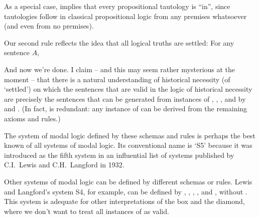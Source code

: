 As a special case,  implies that every propositional tautology is
``in'', since tautologies follow in classical propositional logic from any
premises whatsoever (and even from no premises).

Our second rule reflects the idea that all logical truths are settled: For any
sentence $A$,
%
\begin{principles}
\end{principles}


And now we're done. I claim -- and this may seem rather mysterious at the moment
-- that there is a natural understanding of historical necessity (of `settled')
on which the sentences that are valid in the logic of historical necessity are
precisely the sentences that can be generated from instances of , ,
,  and  by  and . (In fact,  is
redundant: any instance of  can be derived from the remaining axioms and
rules.)

The system of modal logic defined by these schemas and  rules is perhaps the
best known of all systems of modal logic. Its conventional name is `S5' because
it was introduced as the fifth system in an influential list of systems
published by C.I.\ Lewis and C.H.\ Langford in 1932.

Other systems of modal logic can be defined by different schemas or rules.
Lewis and Langford's system S4, for example, can be defined by ,
, , ,  and , without
. This system is adequate for other interpretations of the box and the
diamond, where we don't want to treat all instances of  as valid.


